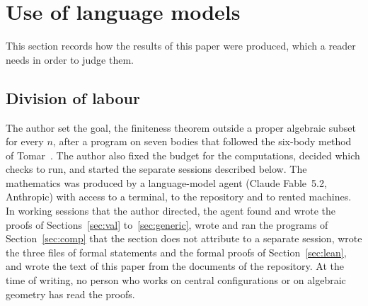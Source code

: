 \documentclass[11pt]{amsart}
\theoremstyle{definition}
\theoremstyle{remark}
\numberwithin{equation}{section}
\begin{document}
\section{Use of language models}\label{sec:llm}

This section records how the results of this paper were produced, which a reader needs in order to
judge them.

\subsection*{Division of labour} The author set the goal, the finiteness theorem outside a proper
algebraic subset for every $n$, after a program on seven bodies that followed the six-body method of
Tomar~\cite{tomar6}. The author also fixed the budget for the computations, decided which checks to
run, and started the separate sessions described below. The mathematics was produced by a
language-model agent (Claude Fable~5.2, Anthropic) with access to a terminal, to the repository and to
rented machines. In working sessions that the author directed, the agent found and wrote the proofs of
Sections~\ref{sec:val} to~\ref{sec:generic}, wrote and ran the programs of Section~\ref{sec:comp} that the section does not attribute to a
separate session, wrote the three files of formal statements and the formal proofs of
Section~\ref{sec:lean}, and wrote the text of this paper from the documents of the repository. At the time of writing, no person who works
on central configurations or on algebraic geometry has read the proofs.
\end{document}
